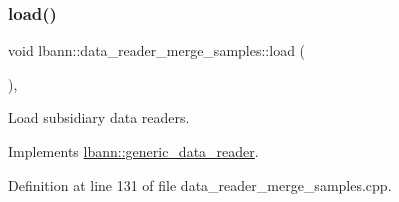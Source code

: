 \subsubsection{\texorpdfstring{load()}{load()}}
{\footnotesize\ttfamily void lbann\+::data\+\_\+reader\+\_\+merge\+\_\+samples\+::load (\begin{DoxyParamCaption}{ }\end{DoxyParamCaption})\hspace{0.3cm}{\ttfamily [override]}, {\ttfamily [virtual]}}



Load subsidiary data readers. 



Implements \hyperlink{classlbann_1_1generic__data__reader_afeb47703d988a230a59859cbfc178215}{lbann\+::generic\+\_\+data\+\_\+reader}.



Definition at line 131 of file data\+\_\+reader\+\_\+merge\+\_\+samples.\+cpp.


